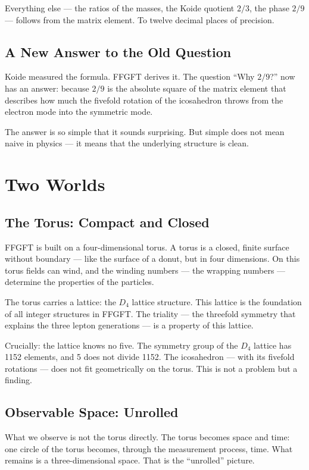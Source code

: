 \documentclass[12pt,oneside]{book}
\begin{document}
Everything else --- the ratios of the masses, the Koide quotient $2/3$, the phase $2/9$ --- follows from the matrix element. To twelve decimal places of precision.

\section{A New Answer to the Old Question}

Koide measured the formula. FFGFT derives it. The question ``Why $2/9$?'' now has an answer: because $2/9$ is the absolute square of the matrix element that describes how much the fivefold rotation of the icosa\-hedron throws from the electron mode into the symmetric mode.

The answer is so simple that it sounds surprising. But simple does not mean naive in physics --- it means that the underlying structure is clean.

\chapter{Two Worlds}

\section{The Torus: Compact and Closed}

FFGFT is built on a four-dimen\-sional torus. A torus is a closed, finite surface without boundary --- like the surface of a donut, but in four dimensions. On this torus fields can wind, and the winding numbers --- the wrapping numbers --- determine the properties of the particles.

The torus carries a lattice: the $D_4$ lattice structure. This lattice is the foundation of all integer structures in FFGFT. The triality --- the threefold symmetry that explains the three lepton generations --- is a property of this lattice.

Crucially: the lattice knows no five. The symmetry group of the $D_4$ lattice has 1152 elements, and 5 does not divide 1152. The icosa\-hedron --- with its fivefold rotations --- does not fit geometrically on the torus. This is not a problem but a finding.

\section{Observable Space: Unrolled}

What we observe is not the torus directly. The torus becomes space and time: one circle of the torus becomes, through the measurement process, time. What remains is a three-dimensional space. That is the ``unrolled'' picture.
\end{document}

